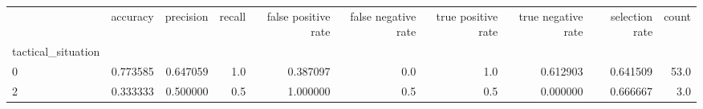\begin{tabular}{lrrrrrrrrr}
\toprule
{} &  accuracy &  precision &  recall &  false positive rate &  false negative rate &  true positive rate &  true negative rate &  selection rate &  count \\
tactical\_situation &           &            &         &                      &                      &                     &                     &                 &        \\
\midrule
0                  &  0.773585 &   0.647059 &     1.0 &             0.387097 &                  0.0 &                 1.0 &            0.612903 &        0.641509 &   53.0 \\
2                  &  0.333333 &   0.500000 &     0.5 &             1.000000 &                  0.5 &                 0.5 &            0.000000 &        0.666667 &    3.0 \\
\bottomrule
\end{tabular}
